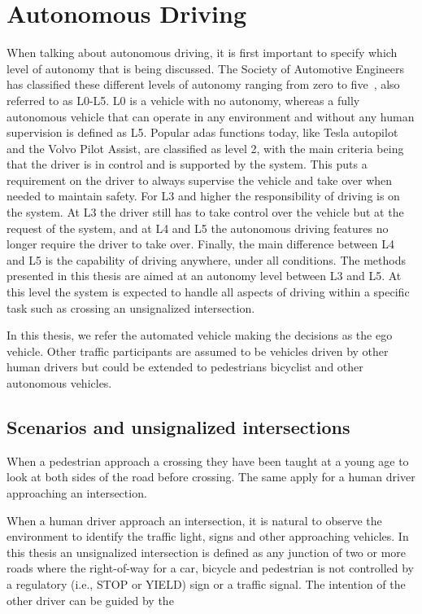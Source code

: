 \section{Autonomous Driving}
\label{sec:intro_ad}
When talking about autonomous driving, it is first important to specify which level of autonomy that is being discussed. The Society of Automotive Engineers has classified these different levels of autonomy ranging from zero to five~\cite{SAE2021}, also referred to as L0-L5. L0 is a vehicle with no autonomy, whereas a fully autonomous vehicle that can operate in any environment and without any human supervision is defined as L5. Popular \gls{adas} functions today, like Tesla autopilot and the Volvo Pilot Assist, are classified as level 2, with the main criteria being that the driver is in control and is supported by the system. This puts a requirement on the driver to always supervise the vehicle and take over when needed to maintain safety. For L3 and higher the responsibility of driving is on the system. At L3 the driver still has to take control over the vehicle but at the request of the system, and at L4 and L5 the autonomous driving features no longer require the driver to take over. Finally, the main difference between L4 and L5 is the capability of driving anywhere, under all conditions. 
The methods presented in this thesis are aimed at an autonomy level between L3 and L5. At this level the system is expected to handle all aspects of driving within a specific task such as crossing an unsignalized intersection. 

In this thesis, we refer the automated vehicle making the decisions as the ego vehicle.
Other traffic participants are assumed to be vehicles driven by other human drivers but could be extended to pedestrians bicyclist and other autonomous vehicles. 


\subsection{Scenarios and unsignalized intersections}
\label{sec:intro_intersections}
When a pedestrian approach a crossing they have been taught at a young age to look at both sides of the road before crossing. The same apply for a human driver approaching an intersection. 

When a human driver approach an intersection, it is natural to observe the environment to identify the traffic light, signs and other approaching vehicles. 
In this thesis an unsignalized intersection is defined as any junction of two or more roads where the right-of-way for a car, bicycle and pedestrian is not controlled by a regulatory (i.e., STOP or YIELD) sign or a traffic signal.
The intention of the other driver can be guided by the 


